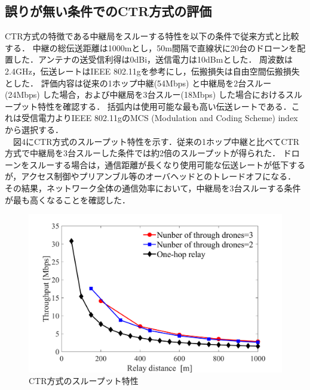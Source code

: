 \documentclass[a4paper,10pt]{ltjsarticle}
\begin{document}
\subsection{誤りが無い条件でのCTR方式の評価}
CTR方式の特徴である中継局をスルーする特性を以下の条件で従来方式と比較する．
中継の総伝送距離は1000mとし，50m間隔で直線状に20台のドローンを配置した．アンテナの送受信利得は0dBi，送信電力は10dBmとした．
周波数は2.4GHz，伝送レートはIEEE 802.11gを参考にし，伝搬損失は自由空間伝搬損失とした．
評価内容は従来の1ホップ中継(54Mbps) と中継局を2台スルー(24Mbps) した場合，および中継局を3台スルー(18Mbps) した場合におけるスループット特性を確認する．
括弧内は使用可能な最も高い伝送レートである．これは受信電力よりIEEE 802.11gのMCS (Modulation and Coding Scheme) indexから選択する．
\\　図4にCTR方式のスループット特性を示す．従来の1ホップ中継と比べてCTR方式で中継局を3台スルーした条件では約2倍のスループットが得られた．
ドローンをスルーする場合は，通信距離が長くなり使用可能な伝送レートが低下するが，アクセス制御やプリアンブル等のオーバヘッドとのトレードオフになる．
その結果，ネットワーク全体の通信効率において，中継局を3台スルーする条件が最も高くなることを確認した．
\begin{figure}[H]
  \centering
  \includegraphics[width=\linewidth]{throughtput_vs_placement_50m_max_distance_3.pdf} 
  \caption{CTR方式のスループット特性}
  \label{fig:throughput_through} 
\end{figure}
\end{document}
